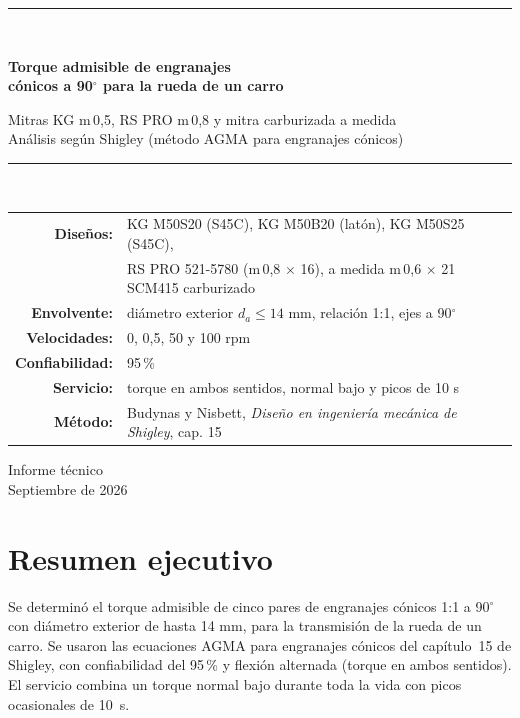 \documentclass[11pt,a4paper]{article}
\begin{document}
\begin{titlepage}
\centering
\vspace*{2.2cm}
{\color{azul}\rule{\linewidth}{1.2pt}}\\[0.8cm]
{\Huge\bfseries Torque admisible de engranajes\\[0.25cm] cónicos a 90$^\circ$ para la rueda de un carro\par}
\vspace{0.6cm}
{\Large Mitras KG m\,0,5, RS PRO m\,0,8 y mitra carburizada a medida\\ Análisis según Shigley (método AGMA para engranajes cónicos)\par}
\vspace{0.6cm}
{\color{azul}\rule{\linewidth}{1.2pt}}\\[1.4cm]
\begin{tabular}{rl}
\textbf{Diseños:} & KG M50S20 (S45C), KG M50B20 (latón), KG M50S25 (S45C),\\
 & RS PRO 521-5780 (m\,0,8 $\times$ 16), a medida m\,0,6 $\times$ 21 SCM415 carburizado\\
\textbf{Envolvente:} & diámetro exterior $d_a\le14$ mm, relación 1:1, ejes a 90$^\circ$\\
\textbf{Velocidades:} & 0, 0,5, 50 y 100 rpm\\
\textbf{Confiabilidad:} & 95\,\%\\
\textbf{Servicio:} & torque en ambos sentidos, normal bajo y picos de 10 s\\
\textbf{Método:} & Budynas y Nisbett, \textit{Diseño en ingeniería mecánica de Shigley}, cap. 15\\
\end{tabular}
\vfill
{\large Informe técnico\\ Septiembre de 2026\par}
\end{titlepage}

\section*{Resumen ejecutivo}
Se determinó el torque admisible de cinco pares de engranajes cónicos 1:1 a 90$^\circ$ con diámetro exterior de hasta 14 mm,
para la transmisión de la rueda de un carro. Se usaron las ecuaciones AGMA para engranajes cónicos del capítulo~15 de Shigley,
con confiabilidad del 95\,\% y flexión alternada (torque en ambos sentidos). El servicio combina un torque normal bajo
durante toda la vida con picos ocasionales de 10~s.
\end{document}
